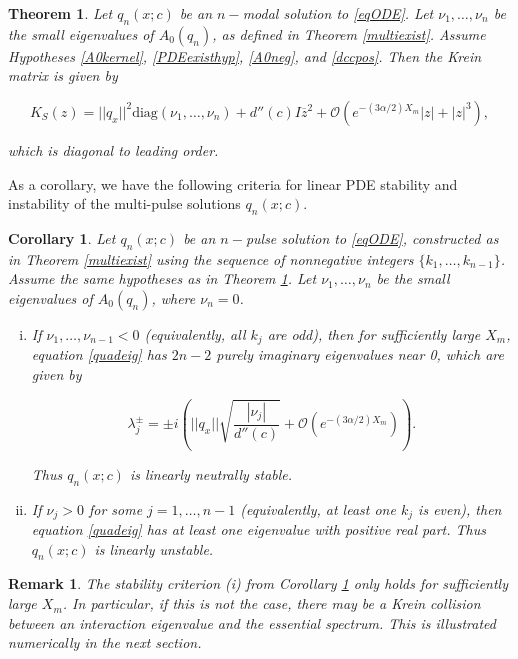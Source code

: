\documentclass[12pt]{article}
\newtheorem{theorem}{Theorem}
\newtheorem{corollary}{Corollary}
\newtheorem{remark}{Remark}
\begin{document}
\begin{theorem}\label{Kreindiag}
Let $q_n(x; c)$ be an $n-$modal solution to \eqref{eqODE}. Let $\nu_1, \dots, \nu_n$ be the small eigenvalues of $A_0(q_n)$, as defined in Theorem \ref{multiexist}. Assume Hypotheses \ref{A0kernel}, \ref{PDEexisthyp}, \ref{A0neg}, and \ref{dccpos}. Then the Krein matrix is given by

\begin{equation}\label{Kreinapprox}
K_S(z) = ||q_x||^2 \text{diag} (\nu_1, \dots, \nu_n)
 + d''(c) I \overline{z}^2 + \mathcal{O}(e^{-(3 \alpha/2) X_m}|z| + |z|^3),
\end{equation}

which is diagonal to leading order.

\end{theorem}

As a corollary, we have the following criteria for linear PDE stability and instability of the multi-pulse solutions $q_n(x; c)$.

\begin{corollary}\label{stabcrit}
Let $q_n(x; c)$ be an $n-$pulse solution to \eqref{eqODE}, constructed as in Theorem \ref{multiexist} using the sequence of nonnegative integers $\{ k_1, \dots, k_{n-1} \}$. Assume the same hypotheses as in Theorem \ref{Kreindiag}. Let $\nu_1, \dots, \nu_n$ be the small eigenvalues of $A_0(q_n)$, where $\nu_n = 0$.
\begin{enumerate}[(i)]
	\item If $\nu_1, \dots, \nu_{n-1} < 0$ (equivalently, all $k_j$ are odd), then for sufficiently large $X_m$, equation \eqref{quadeig} has $2n - 2$ purely imaginary eigenvalues near 0, which are given by

	\begin{equation}\label{npulseKreineigs}
	\lambda_j^\pm = \pm i \left( ||q_x|| \sqrt{ \frac{|\nu_j|}{d''(c)} } + \mathcal{O}(e^{-(3 \alpha/2) X_m}) \right).
	\end{equation}

	Thus $q_n(x; c)$ is linearly neutrally stable.

	\item If $\nu_j > 0$ for some $j = 1, \dots, n-1$ (equivalently, at least one $k_j$ is even), then equation \eqref{quadeig} has at least one eigenvalue with positive real part. Thus $q_n(x; c)$ is linearly unstable.
\end{enumerate}
\end{corollary}

\begin{remark}The stability criterion (i) from Corollary \ref{stabcrit} only holds for sufficiently large $X_m$. In particular, if this is not the case, there may be a Krein collision between an interaction eigenvalue and the essential spectrum. This is illustrated numerically in the next section.
\end{remark}
\end{document}
